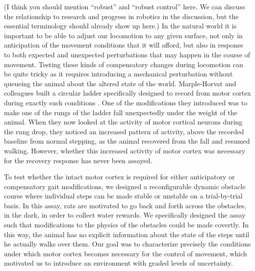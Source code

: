 (I think you should mention ``robust'' and ``robust control'' here. We can discuss the relationship to research and progress in robotics in the discussion, but the essential terminology should already show up here.)
In the natural world it is important to be able to adjust our locomotion to any given surface, not only in anticipation of the movement conditions that it will afford, but also in response to both expected and unexpected perturbations that may happen in the course of movement. Testing these kinds of compensatory changes during locomotion can be quite tricky as it requires introducing a mechanical perturbation without queueing the animal about the altered state of the world. Marple-Horvat and colleagues built a circular ladder specifically designed to record from motor cortex during exactly such conditions \cite{Marple-Horvat1993}. One of the modifications they introduced was to make one of the rungs of the ladder fall unexpectedly under the weight of the animal. When they now looked at the activity of motor cortical neurons during the rung drop, they noticed an increased pattern of activity, above the recorded baseline from normal stepping, as the animal recovered from the fall and resumed walking. However, whether this increased activity of motor cortex was necessary for the recovery response has never been assayed.

To test whether the intact motor cortex is required for either anticipatory or compensatory gait modifications, we designed a reconfigurable dynamic obstacle course where individual steps can be made stable or unstable on a trial-by-trial basis. In this assay, rats are motivated to go back and forth across the obstacles, in the dark, in order to collect water rewards. We specifically designed the assay such that modifications to the physics of the obstacles could be made covertly. In this way, the animal has no explicit information about the state of the steps until he actually walks over them. Our goal was to characterize precisely the conditions under which motor cortex becomes necessary for the control of movement, which motivated us to introduce an environment with graded levels of uncertainty.


